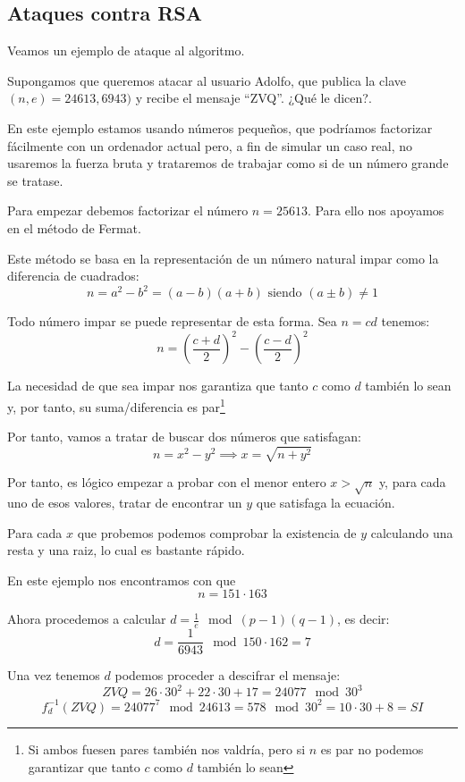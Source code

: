 \subsection{Ataques contra RSA}
Veamos un ejemplo de ataque al algoritmo.
\begin{example}
Supongamos que queremos atacar al usuario Adolfo, que publica la clave $(n,e) = 24613,6943)$ y recibe el mensaje ``ZVQ''. ¿Qué le dicen?.

\obs En este ejemplo estamos usando números pequeños, que podríamos factorizar fácilmente con un ordenador actual pero, a fin de simular un caso real, no usaremos la fuerza bruta y trataremos de trabajar como si de un número grande se tratase.

Para empezar debemos factorizar el número $n=25613$. Para ello nos apoyamos en el método de Fermat.

\begin{defn}
Este método se basa en la representación de un número natural impar como la diferencia de cuadrados:
\[n = a^2-b^2 = (a-b)(a+b) \text{ siendo } (a\pm b) \neq 1\]

\obs Todo número impar se puede representar de esta forma. Sea $n=cd$ tenemos:
\[n = \left( \frac{c+d}{2}\right)^2 - \left( \frac{c-d}{2}\right)^2\]

La necesidad de que sea impar nos garantiza que tanto $c$ como $d$ también lo sean y, por tanto, su suma/diferencia es par\footnote{Si ambos fuesen pares también nos valdría, pero si $n$ es par no podemos garantizar que tanto $c$ como $d$ también lo sean}
\end{defn}

Por tanto, vamos a tratar de buscar dos números que satisfagan:
\[n=x^2-y^2 \implies x = \sqrt{n+y^2}\]

Por tanto, es lógico empezar a probar con el menor entero $x>\sqrt{n}$ y, para cada uno de esos valores, tratar de encontrar un $y$ que satisfaga la ecuación.

Para cada $x$ que probemos podemos comprobar la existencia de $y$ calculando una resta y una raiz, lo cual es bastante rápido. 

En este ejemplo nos encontramos con que
\[n = 151 \cdot 163\]

Ahora procedemos a calcular $d=\frac{1}{e} \mod (p-1)(q-1)$, es decir:
\[d = \frac{1}{6943} \mod 150 \cdot 162 = 7 \]

Una vez tenemos $d$ podemos proceder a descifrar el mensaje:
\[ZVQ = 26 \cdot 30^2+22 \cdot 30 +17 = 24077 \mod 30^3\]
\[f_d^{-1}(ZVQ) = 24077^7 \mod 24613 = 578 \mod 30^2 = 10\cdot 30 +8 = SI\]
\end{example}